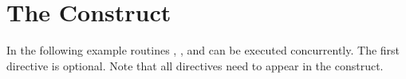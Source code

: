\pagebreak
\section{The   Construct}
\label{sec:psections}

In the following example routines , , and  can 
be executed concurrently. The first  directive is optional. Note 
that all  directives need to appear in the  
construct.



